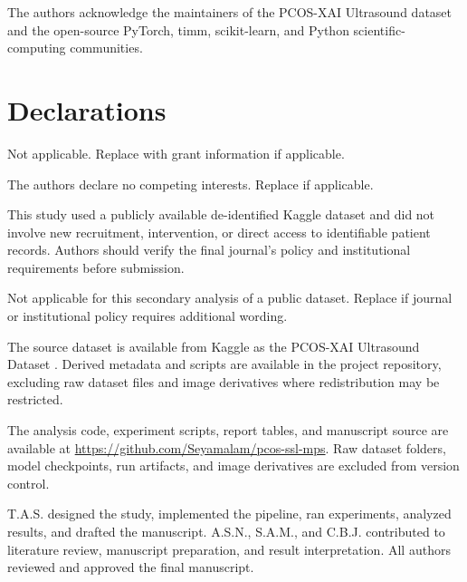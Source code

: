 \documentclass[pdflatex,sn-mathphys-num]{sn-jnl}
\theoremstyle{thmstyleone}
\theoremstyle{thmstyletwo}
\theoremstyle{thmstylethree}
\begin{document}

The authors acknowledge the maintainers of the PCOS-XAI Ultrasound dataset and the open-source PyTorch, timm, scikit-learn, and Python scientific-computing communities.

\section*{Declarations}

Not applicable. Replace with grant information if applicable.

The authors declare no competing interests. Replace if applicable.

This study used a publicly available de-identified Kaggle dataset and did not involve new recruitment, intervention, or direct access to identifiable patient records. Authors should verify the final journal's policy and institutional requirements before submission.

Not applicable for this secondary analysis of a public dataset. Replace if journal or institutional policy requires additional wording.

The source dataset is available from Kaggle as the PCOS-XAI Ultrasound Dataset \cite{ibadeus_pcos_xai}. Derived metadata and scripts are available in the project repository, excluding raw dataset files and image derivatives where redistribution may be restricted.

The analysis code, experiment scripts, report tables, and manuscript source are available at \url{https://github.com/Seyamalam/pcos-ssl-mps}. Raw dataset folders, model checkpoints, run artifacts, and image derivatives are excluded from version control.

T.A.S. designed the study, implemented the pipeline, ran experiments, analyzed results, and drafted the manuscript. A.S.N., S.A.M., and C.B.J. contributed to literature review, manuscript preparation, and result interpretation. All authors reviewed and approved the final manuscript.
\end{document}
